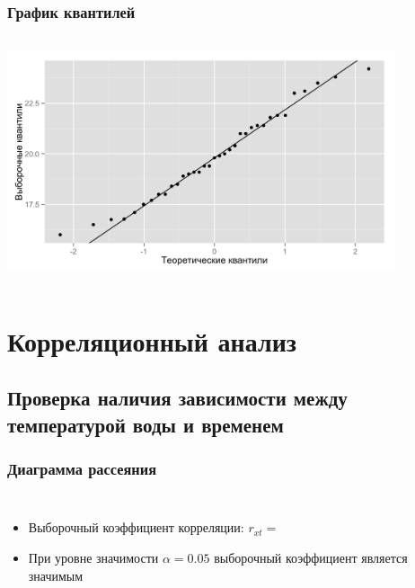 \documentclass[10pt,pdf,aspectratio=169]{beamer}
\newcommand{\inp}[1]{}
\newcommand{\characteristic}[2]{\inp{#1/characteristics/#2}}
\begin{document}
\begin{frame}
  \frametitle{График квантилей}   %
   \begin{columns}[c]
   \column{4.5in}
  \includegraphics[width=4.5in]{../../figures/original/quantile.png}
  \end{columns}
\end{frame}

\section{Корреляционный анализ}

\subsection{Проверка наличия зависимости между температурой воды и временем}
\begin{frame}
  \frametitle{Диаграмма рассеяния}   %
  \begin{columns}[c]
  \column{2in}  %
  \begin{itemize}
  \item<1-> Выборочный коэффициент корреляции: $ r_{xt} = \characteristic{original}{correlation} $
  \item<2-> При уровне значимости $ \alpha=0.05 $ выборочный коэффициент является значимым
  \end{itemize}
  \column{3in}
  \end{columns}
\end{frame}
\end{document}

